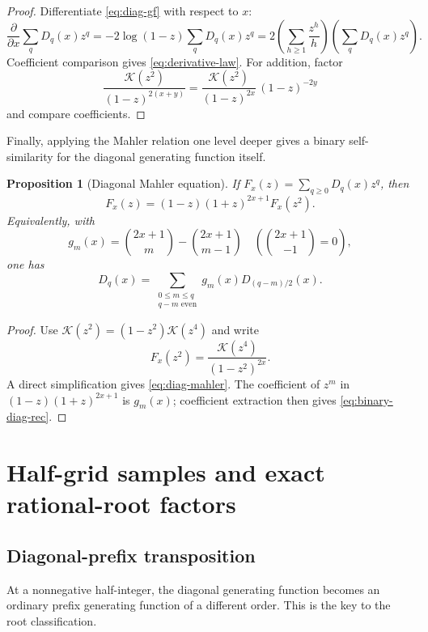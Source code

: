 \documentclass[11pt]{article}
\newtheorem{proposition}[theorem]{Proposition}
\theoremstyle{definition}
\theoremstyle{remark}
\newcommand{\K}{\mathcal K}
\newcommand{\Diag}{D}
\begin{document}
\begin{proof}
Differentiate \cref{eq:diag-gf} with respect to \(x\):
\[
 \frac{\partial}{\partial x}\sum_q\Diag_q(x)z^q
 =-2\log(1-z)\sum_q\Diag_q(x)z^q
 =2\left(\sum_{h\geq1}\frac{z^h}{h}\right)
   \left(\sum_q\Diag_q(x)z^q\right).
\]
Coefficient comparison gives \cref{eq:derivative-law}.  For addition,
factor
\[
 \frac{\K(z^2)}{(1-z)^{2(x+y)}}
 =\frac{\K(z^2)}{(1-z)^{2x}}\,(1-z)^{-2y}
\]
and compare coefficients.
\end{proof}

Finally, applying the Mahler relation one level deeper gives a binary
self-similarity for the diagonal generating function itself.

\begin{proposition}[Diagonal Mahler equation]
If \(F_x(z)=\sum_{q\geq0}\Diag_q(x)z^q\), then
\begin{equation}
 \boxed{F_x(z)=(1-z)(1+z)^{2x+1}F_x(z^2).}                 \label{eq:diag-mahler}
\end{equation}
Equivalently, with
\[
 g_m(x)=\binom{2x+1}{m}-\binom{2x+1}{m-1}
 \quad\left(\binom{2x+1}{-1}=0\right),
\]
one has
\begin{equation}
 \Diag_q(x)=
 \sum_{\substack{0\leq m\leq q\\q-m\text{ even}}}
 g_m(x)\Diag_{(q-m)/2}(x).                                 \label{eq:binary-diag-rec}
\end{equation}
\end{proposition}

\begin{proof}
Use \(\K(z^2)=(1-z^2)\K(z^4)\) and write
\[
 F_x(z^2)=\frac{\K(z^4)}{(1-z^2)^{2x}}.
\]
A direct simplification gives \cref{eq:diag-mahler}.  The coefficient of
\(z^m\) in \((1-z)(1+z)^{2x+1}\) is \(g_m(x)\); coefficient extraction
then gives \cref{eq:binary-diag-rec}.
\end{proof}

\section{Half-grid samples and exact rational-root factors}

\subsection{Diagonal-prefix transposition}

At a nonnegative half-integer, the diagonal generating function becomes an
ordinary prefix generating function of a different order.  This is the key
to the root classification.
\end{document}
